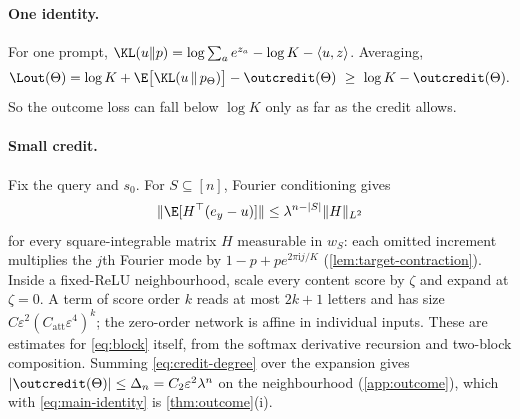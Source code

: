 \paragraph{One identity.} For one prompt, $\KL(u\|p)=\log\sum_ae^{z_a}-\log K-\langle u,z\rangle$. Averaging,
\begin{equation}\label{eq:main-identity}
\Lout(\Theta)=\log K+\E\bigl[\KL(u\,\|\,p_\Theta)\bigr]-\outcredit(\Theta)\ \ge\ \log K-\outcredit(\Theta).
\end{equation}
So the outcome loss can fall below $\log K$ only as far as the credit allows.

\paragraph{Small credit.} Fix the query and $s_0$. For $S\subseteq[n]$, Fourier conditioning gives
\begin{equation}\label{eq:credit-degree}
\|\E[H^\top(e_y-u)]\|\le\lambda^{n-|S|}\|H\|_{L^2}
\end{equation}
for every square-integrable matrix $H$ measurable in $w_S$: each omitted increment multiplies the $j$th Fourier mode by $1-p+pe^{2\pi\mathrm ij/K}$ (\cref{lem:target-contraction}). Inside a fixed-ReLU neighbourhood, scale every content score by $\zeta$ and expand at $\zeta=0$. A term of score order $k$ reads at most $2k+1$ letters and has size $C\varepsilon^2(C_{\mathrm{att}}\varepsilon^4)^k$; the zero-order network is affine in individual inputs. These are estimates for \cref{eq:block} itself, from the softmax derivative recursion and two-block composition. Summing \cref{eq:credit-degree} over the expansion gives $|\outcredit(\Theta)|\le\Delta_n=C_2\varepsilon^2\lambda^n$ on the neighbourhood (\cref{app:outcome}), which with \cref{eq:main-identity} is \cref{thm:outcome}(i).

